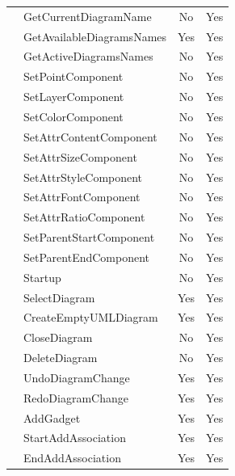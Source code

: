 \documentclass[12pt]{article}
\begin{document}
\begin{longtable}{|l|l|c|c|}
        & GetCurrentDiagramName          & No              & Yes           \\
        & GetAvailableDiagramsNames      & Yes             & Yes           \\
        & GetActiveDiagramsNames         & No              & Yes           \\
        & SetPointComponent              & No              & Yes           \\
        & SetLayerComponent              & No              & Yes           \\
        & SetColorComponent              & No              & Yes           \\
        & SetAttrContentComponent        & No              & Yes           \\
        & SetAttrSizeComponent           & No              & Yes           \\
        & SetAttrStyleComponent          & No              & Yes           \\
        & SetAttrFontComponent           & No              & Yes           \\
        & SetAttrRatioComponent          & No              & Yes           \\
        & SetParentStartComponent        & No              & Yes           \\
        & SetParentEndComponent          & No              & Yes           \\
        & Startup                        & No              & Yes           \\
        & SelectDiagram                  & Yes             & Yes           \\
        & CreateEmptyUMLDiagram          & Yes             & Yes           \\
        & CloseDiagram                   & No              & Yes           \\
        & DeleteDiagram                  & No              & Yes           \\
        & UndoDiagramChange              & Yes             & Yes           \\
        & RedoDiagramChange              & Yes             & Yes           \\
        & AddGadget                      & Yes             & Yes           \\
        & StartAddAssociation            & Yes             & Yes           \\
        & EndAddAssociation              & Yes             & Yes           \\

\end{longtable}
\end{document}
